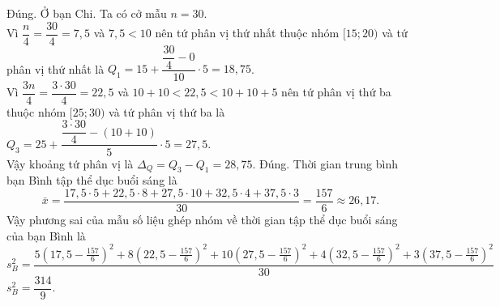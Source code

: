 \begin{ex}
{\begin{itemchoice}
			\itemch Đúng. Ở bạn Chi. Ta có cở mẫu $n=30$.\\
			Vì $\dfrac{n}{4}=\dfrac{30}{4}=7,5$ và $7,5<10$ nên tứ phân vị thứ nhất thuộc nhóm $[15 ; 20)$ và tứ phân vị thứ nhất là $Q_1=15+\dfrac{\dfrac{30}{4}-0}{10} \cdot 5=18,75$.\\
			Vì $\dfrac{3 n}{4}=\dfrac{3\cdot30}{4}=22,5$ và $10+10<22,5<10+10+5$ nên tứ phân vị thứ ba thuộc nhóm $[25 ; 30)$
			và tứ phân vị thứ ba là $Q_3=25+\dfrac{\dfrac{3\cdot30}{4}-(10+10)}{5} \cdot5=27,5$.\\
			Vậy khoảng tứ phân vị là $\Delta_Q=Q_3-Q_1=28,75$.
			\itemch Đúng. Thời gian trung bình bạn Bình tập thể dục buổi sáng là
			$$
			\bar{x}=\dfrac{17,5\cdot5+22,5\cdot8+27,5\cdot10+32,5\cdot4+37,5\cdot3}{30}=\dfrac{157}{6} \approx 26,17.
			$$
			Vậy phương sai của mẫu số liệu ghép nhóm về thời gian tập thể dục buổi sáng của bạn Bình là
			$$
			s_B^2=\dfrac{5\left(17,5-\frac{157}{6}\right)^2+8\left(22,5-\frac{157}{6}\right)^2+10\left(27,5-\frac{157}{6}\right)^2+4\left(32,5-\frac{157}{6}\right)^2+3\left(37,5-\frac{157}{6}\right)^2}{30}
			$$
			$s_B^2=\dfrac{314}{9}.$
		\end{itemchoice}
	}
\end{ex}

